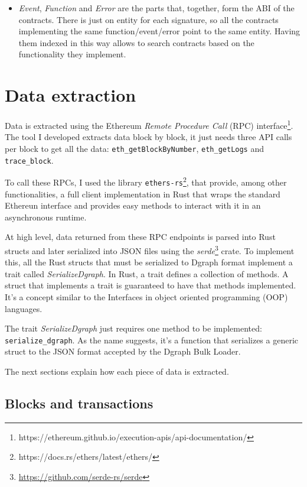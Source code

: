 \begin{itemize}
    \item \textit{Event}, \textit{Function} and \textit{Error} are the parts that, together, form the ABI of the contracts. There is just on entity for each signature, so all the contracts implementing the same function/event/error point to the same entity. Having them indexed in this way allows to search contracts based on the functionality they implement.
    
\end{itemize}

\section{Data extraction}

Data is extracted using the Ethereum \textit{Remote Procedure Call} (RPC) interface\footnote{https://ethereum.github.io/execution-apis/api-documentation/}. The tool I developed extracts data block by block, it just needs three API calls per block to get all the data: \texttt{eth\_getBlockByNumber}, \texttt{eth\_getLogs} and \texttt{trace\_block}. 

To call these RPCs, I used the library \texttt{ethers-rs}\footnote{https://docs.rs/ethers/latest/ethers/}, that provide, among other functionalities, a full client implementation in Rust that wraps the standard Ethereun interface and provides easy methods to interact with it in an asynchronous runtime.

At high level, data returned from these RPC endpoints is parsed into Rust structs and later serialized into JSON files using the \textit{serde}\footnote{\url{https://github.com/serde-rs/serde}} crate. To implement this, all the Rust structs that must be serialized to Dgraph format implement a trait called \textit{SerializeDgraph}. In Rust, a trait defines a collection of methods. A struct that implements a trait is guaranteed to have that methods implemented. It's a concept similar to the Interfaces in object oriented programming (OOP) languages.

The trait \textit{SerializeDgraph} just requires one method to be implemented:\\ \texttt{serialize\_dgraph}. As the name suggests, it's a function that serializes a generic struct to the JSON format accepted by the Dgraph Bulk Loader.

The next sections explain how each piece of data is extracted.

\subsection{Blocks and transactions}

